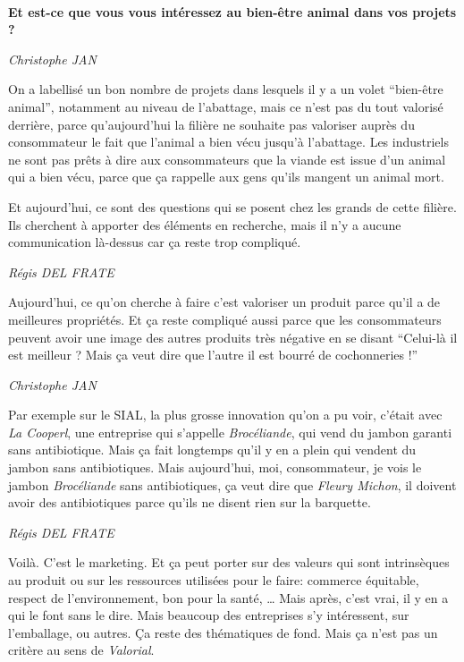 \documentclass[a4paper,12pt]{report}
\begin{document}
	\textbf{\\Et est-ce que vous vous intéressez au bien-être animal dans vos projets ?}

	\emph{Christophe JAN}
	 
    On a labellisé un bon nombre de projets dans lesquels il y a un volet “bien-être animal”, notamment au niveau de l’abattage, mais ce n’est pas du tout valorisé derrière, parce qu’aujourd’hui la filière ne souhaite pas valoriser auprès du consommateur le fait que l’animal a bien vécu jusqu’à l’abattage. Les industriels ne sont pas prêts à dire aux consommateurs que la viande est issue d’un animal qui a bien vécu, parce que ça rappelle aux gens qu’ils mangent un animal mort.
 
    Et aujourd’hui, ce sont des questions qui se posent chez les grands de cette filière. Ils cherchent à apporter des éléments en recherche, mais il n’y a aucune communication là-dessus car ça reste trop compliqué. 

	\emph{Régis DEL FRATE}
    
    Aujourd’hui, ce qu’on cherche à faire c’est valoriser un produit parce qu’il a de meilleures propriétés. Et ça reste compliqué aussi parce que les consommateurs peuvent avoir une image des autres produits très négative en se disant “Celui-là il est meilleur ? Mais ça veut dire que l’autre il est bourré de cochonneries !”

	\emph{Christophe JAN}
	 
    Par exemple sur le SIAL, la plus grosse innovation qu’on a pu voir, c’était avec \textit{La Cooperl}, une entreprise qui s’appelle \textit{Brocéliande}, qui vend du jambon garanti sans antibiotique. Mais ça fait longtemps qu’il y en a plein qui vendent du jambon sans antibiotiques. Mais aujourd’hui, moi, consommateur, je vois le jambon \textit{Brocéliande} sans antibiotiques, ça veut dire que \textit{Fleury Michon}, il doivent avoir des antibiotiques parce qu’ils ne disent rien sur la barquette.

	\emph{Régis DEL FRATE}
    
    Voilà. C’est le marketing. Et ça peut porter sur des valeurs qui sont intrinsèques au produit ou sur les ressources utilisées pour le faire: commerce équitable, respect de l’environnement, bon pour la santé, … Mais après, c’est vrai, il y en a qui le font sans le dire. Mais beaucoup des entreprises s’y intéressent, sur l’emballage, ou autres. Ça reste des thématiques de fond. Mais ça n’est pas un critère au sens de \textit{Valorial}.
 
\end{document}
